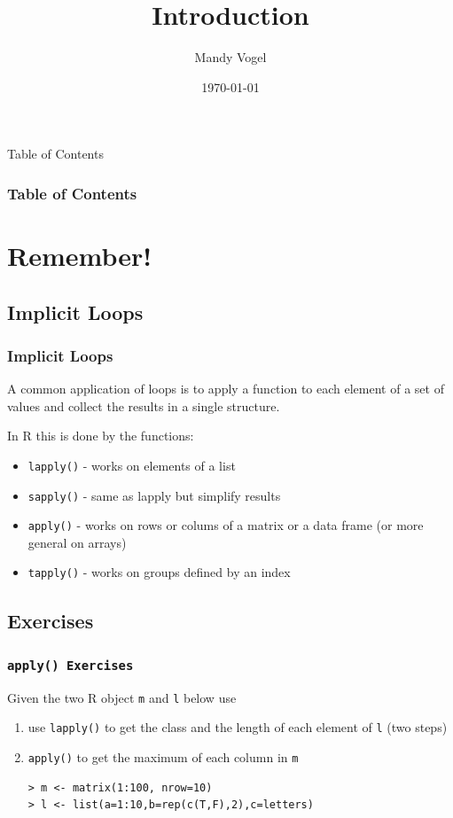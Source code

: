 \documentclass[xcolor={table},c]{beamer}
\begin{document}
\title{Introduction}   
\author{Mandy Vogel} 
\date{\today}


\begin{frame}
\titlepage
\end{frame}

\begin{frame}[allowframebreaks,t]{Table of Contents}
\frametitle{Table of Contents}\tableofcontents
\end{frame}

\section{Remember!}
\subsection{Implicit Loops}
\begin{frame}[fragile]\frametitle{Implicit Loops}
A common application of loops is  to apply a function to each element of a set of values and collect the results in a single structure.

In R this is done by the functions:
\begin{itemize}
 \item \texttt{lapply()} - works on elements of a list
 \item \texttt{sapply()} - same as lapply but simplify results
 \item \texttt{apply()} - works on rows or colums of a matrix or a data frame (or more general on arrays)
 \item \texttt{tapply()} - works on groups defined by an index
\end{itemize}
\end{frame}


\subsection{Exercises}
\begin{frame}\frametitle{\texttt{\texttt{apply()} Exercises}}
Given the two R object \texttt{m} and \texttt{l} below use
  \begin{enumerate}
  \item  use \texttt{lapply()} to get the class and the length of each element of \texttt{l} (two steps)
  \item  \texttt{apply()} to get the maximum of each column in \texttt{m}
\begin{verbatim}
> m <- matrix(1:100, nrow=10)
> l <- list(a=1:10,b=rep(c(T,F),2),c=letters)  
\end{verbatim}
  \end{enumerate}
\end{frame}
\end{document}
